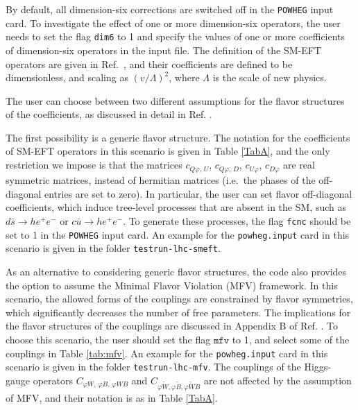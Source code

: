 \documentclass[paper]{JHEP3}
\newcommand\POWHEG{{\tt POWHEG}}
\begin{document}
By default, all dimension-six corrections are switched off in the \POWHEG{} input card.
To investigate the effect of one or more dimension-six operators, the user  needs to set the flag \texttt{dim6} to 1 and specify the values of 
one or more coefficients of dimension-six operators in the input file. The definition of the SM-EFT operators are given in Ref.\ \cite{Alioli:2018ljm},
and their coefficients are defined to be dimensionless, and scaling as $(v/\Lambda)^2$, where $\Lambda$ is the scale of new physics.

The user can choose between two different assumptions for the flavor structures of the coefficients, as discussed in detail in Ref. \cite{Alioli:2018ljm}.

The first possibility is a generic flavor structure. The notation for the coefficients of SM-EFT operators in this scenario is given in Table \ref{TabA},
and the only restriction we impose is that the matrices $c^{}_{Q\varphi,\, U}$, $c^{}_{Q\varphi,\, D}$, $c^{}_{U\varphi}$, $c^{}_{D\varphi}$
are real symmetric matrices, instead of hermitian matrices (i.e.\ the phases of the off-diagonal 
entries are set to zero). In particular, the user can set flavor off-diagonal coefficients, which induce tree-level processes that are absent in the SM, such as $d \bar s \rightarrow h e^+ e^-$ 
or $c \bar u \rightarrow h e^+ e^-$. To generate these processes, the flag \texttt{fcnc} should be set to 1 in the \POWHEG{} input card.   
An example for the \texttt{powheg.input}  card in this scenario is given in the folder \texttt{testrun-lhc-smeft}.


As an alternative to considering generic flavor structures, the code also provides the option to assume the Minimal Flavor Violation (MFV) framework. In this scenario, the allowed forms of the couplings are constrained by  flavor symmetries, which significantly decreases the number of free parameters. 
The implications for the flavor structures of the couplings are discussed in Appendix B of Ref. \cite{Alioli:2018ljm}.
To choose this scenario, the user should set the flag $\texttt{mfv}$ to 1, and select some of the couplings in Table \ref{tab:mfv}.
An example for the \texttt{powheg.input}  card in this scenario is given in the folder \texttt{testrun-lhc-mfv}. The couplings of the Higgs-gauge operators
$C_{\varphi W,\, \varphi B, \, \varphi W B}$ and $C_{\varphi \tilde{W},\varphi \tilde{B},\varphi \tilde{W} B}$ are not affected by the assumption of MFV, and their notation is as in Table
\ref{TabA}.
\end{document}
